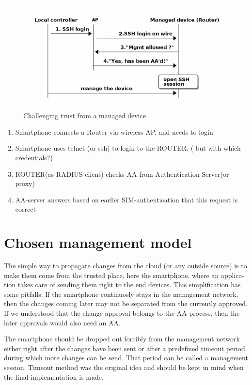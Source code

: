 \documentclass[12pt,a4paper,english]{tutthesis}
\begin{document}
\begin{otherlanguage}{english}
\begin{figure}[htb]
\centering
\includegraphics[width=.9\linewidth]{trust-register.png}
\caption{\label{fig:trust-register}Challenging trust from a managed device}
\end{figure}





\begin{enumerate}
\item Smartphone connects a Router via wireless AP, and needs to login
\item Smartphone uses telnet (or ssh) to login to the ROUTER.
( but with which credentials?)
\item ROUTER(as RADIUS client) checks AA from Authentication Server(or 
proxy)
\item AA-server answers based on earlier SIM-authentication that this
request is correct
\end{enumerate}



\section{Chosen management model}
\label{sec-4-5}





The simple way to propagate changes from the cloud (or any outside
source) is to make them come from the trusted place, here the smartphone,
where an application takes care of sending them right to the end
devices. This simplification has some pitfalls. If the smartphone continuosly stays
in the management network, then the changes coming later may not be 
separated from the currently approved.
If we understood that the change approval belongs to the AA-process, then
the later approvals would also need an AA.

 The smartphone should be dropped out forcibly from the management
network either right after the changes have been sent or after a
predefined timeout period during which more changes can be send.  That
period can be called a management session.  Timeout method was the
original idea and should be kept in mind when the final implementation
is made.


\end{otherlanguage}
\end{document}
